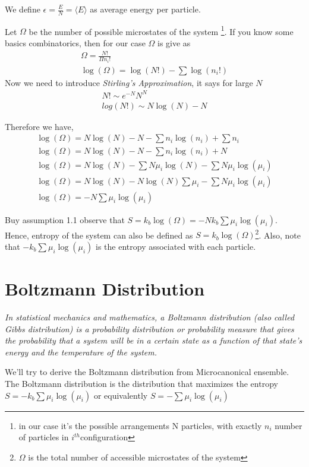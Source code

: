 \documentclass{tufte-handout}
\begin{document}
 We define \(\epsilon = \frac{E}{N} = \langle E \rangle\) as average energy per particle.

Let \(\Omega\) be the number of possible microstates of the system
\footnote{in our case it's the possible arrangements N particles, with exactly \(n_i\) number of particles
in \(i^{th}\)configuration}.
 If you know some basics combinatorics, then for our case \(\Omega\) is give as 
 \[\begin{gathered}
	\Omega  = \frac{N!}{\Pi n_i !}\\
	\log(\Omega) = \log(N!) - \sum \log(n_i!)
 \end{gathered}\]
Now we need to introduce \textit{Stirling's Approximation}, it says for large \(N\)
\[\begin{gathered}
	N! \sim e^{-N} N^N\\
	log(N!) \sim N \log(N) - N
\end{gathered}\]

Therefore we have, 
\[\begin{gathered}
	\log(\Omega) = N \log(N) - N - \sum n_i \log(n_i)  + \sum n_i \\
	\log(\Omega) = N \log(N) - N - \sum n_i \log(n_i)  + N \\
	\log(\Omega) = N \log(N) - \sum N \mu _i\log(N)  - \sum N \mu _i\log(\mu_i)\\ 
	\log(\Omega) = N \log(N) - N \log(N) \sum  \mu _i  - \sum N \mu_i \log(\mu_i) \\
	\log(\Omega) = -N\sum \mu_i \log(\mu_i)
\end{gathered}\]

Buy assumption 1.1 observe that  \(\boxed{S = k_b\log(\Omega) =
 -N k_b \sum \mu_i\log(\mu_i)}\). Hence, entropy of the system can also be defined as 
 \(S = k_b \log(\Omega)\)\footnote{\(\Omega\) is the total number of accessible
 microstates of the system}. Also, note that \(-k_b \sum \mu_i\log(\mu_i)\)  is the entropy associated
 with each particle. 

\section{Boltzmann Distribution}
\textit{In statistical mechanics and mathematics, a Boltzmann distribution 
(also called Gibbs distribution) is a probability distribution or probability
 measure that gives the probability that a system will be in a 
certain state as a function of that state's energy and the temperature of the system.}

We'll try to derive the Boltzmann distribution from Microcanonical ensemble. The Boltzmann 
distribution is the distribution that maximizes the entropy \(S = -k_b 
\sum \mu_i\log(\mu_i)\) or equivalently \(S = -\sum \mu_i\log(\mu_i)\)
\end{document}
